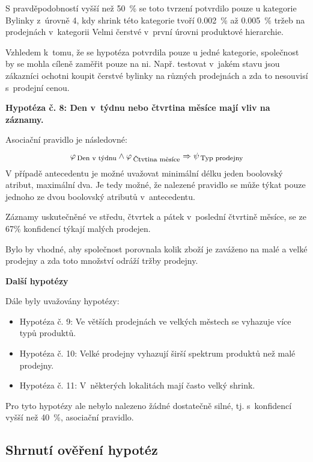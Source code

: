 S pravděpodobností vyšší než 50~\% se toto tvrzení potvrdilo pouze u kategorie Bylinky z~úrovně 4, kdy shrink této kategorie tvoří 0.002~\% až 0.005~\% tržeb na prodejnách v~kategorii Velmi čerstvé v~první úrovni produktové hierarchie.

Vzhledem k~tomu, že se hypotéza potvrdila pouze u jedné kategorie, společnost by se mohla cíleně zaměřit pouze na ni. Např. testovat v~jakém stavu jsou zákazníci ochotni koupit čerstvé bylinky na různých prodejnách a zda to nesouvisí s~prodejní cenou. 

\vspace*{1em}

\textbf{Hypotéza č. 8: Den v~týdnu nebo čtvrtina měsíce mají vliv na záznamy.}

Asociační pravidlo je následovné:
\begin{equation}
    \varphi_{\mbox{\,{\footnotesize Den v~týdnu}}} \land  \varphi_{\mbox{\,{\footnotesize Čtvtina měsíce}}} \Rightarrow \psi_{\mbox{\,{\footnotesize Typ prodejny}}}
\end{equation} 
V případě antecedentu je možné uvažovat minimální délku jeden boolovský atribut, maximální dva. Je tedy možné, že nalezené pravidlo se může týkat pouze jednoho ze dvou boolovský atributů v~antecedentu.

Záznamy uskutečněné ve středu, čtvrtek a pátek v~poslední čtvrtině měsíce, se ze 67\% konfidencí týkají malých prodejen.

Bylo by vhodné, aby společnost porovnala kolik zboží je zaváženo na malé a velké prodejny a zda toto množství odráží tržby prodejny.

\textbf{Další hypotézy}

Dále byly uvažovány hypotézy:
\begin{itemize}
    \itemsep 0em
    \item Hypotéza č. 9: Ve větších prodejnách ve velkých městech se vyhazuje více typů produktů.
    \item Hypotéza č. 10: Velké prodejny vyhazují širší spektrum produktů než malé prodejny.
    \item Hypotéza č. 11: V~některých lokalitách mají často velký shrink.
\end{itemize}

Pro tyto hypotézy ale nebylo nalezeno žádné dostatečně silné, tj. s~konfidencí vyšší než 40~\%, asociační pravidlo.

\subsection*{Shrnutí ověření hypotéz}

